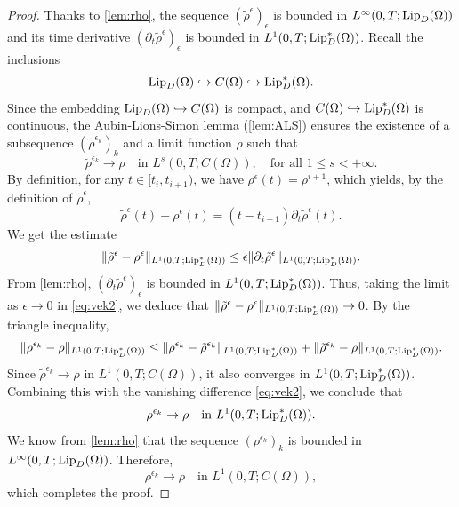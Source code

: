 \documentclass[final,reqno]{amsart}
\theoremstyle{plain}
\theoremstyle{definition}
\theoremstyle{remark}
\numberwithin{remark}{section}	%
\numberwithin{example}{section}	%
\newcommand{\Om}{\Omega}
\newcommand{\Lip}{\textup{Lip}}
\begin{document}
\begin{proof}
    Thanks to \cref{lem:rho}, the sequence $(\tilde{\rho}^{\epsilon})_{\epsilon}$ is bounded in $L^{\infty}(0,T; \Lip_D(\Omega))$ and its time derivative $(\partial_t \tilde{\rho}^{\epsilon})_{\epsilon}$ is bounded in $L^1(0,T; \Lip_{D}^*(\Om))$. 
    Recall the inclusions
    \[
        \Lip_{D}(\Om) \hookrightarrow C(\Om) \hookrightarrow \Lip_{D}^*(\Om).
    \]
    Since the embedding $\Lip_{D}(\Om) \hookrightarrow C(\Om)$ is compact, and $C(\Om) \hookrightarrow \Lip_{D}^*(\Om)$ is continuous, the Aubin-Lions-Simon lemma (\cref{lem:ALS}) ensures the existence of a subsequence $(\tilde{\rho}^{\epsilon_k})_{k}$ and a limit function $\rho$ such that
    \begin{equation}\label{eq:vek}
        \tilde{\rho}^{\epsilon_k} \to \rho \quad \text{in } L^s(0,T; C(\Omega)), \quad \text{for all } 1 \le s < +\infty.
    \end{equation}
     By definition, for any $t \in [t_i, t_{i+1})$, we have $\rho^\epsilon(t) = \rho^{i+1}$, which yields, by the definition of $\tilde{\rho}^{\epsilon}$,
    \begin{equation}
        \tilde{\rho}^{\epsilon}(t) - \rho^\epsilon(t) = (t - t_{i+1}) \partial_t \tilde{\rho}^{\epsilon}(t).
    \end{equation}
    We get the estimate
    \begin{equation}\label{eq:vek2}
        \Vert\tilde{\rho}^{\epsilon} - \rho^{\epsilon}\Vert_{L^1(0,T; \Lip_{D}^*(\Om))} \leq \epsilon \Vert\partial_t \tilde{\rho}^{\epsilon}\Vert_{L^1(0,T; \Lip_{D}^*(\Om))}.
    \end{equation}
    From \cref{lem:rho}, $(\partial_t \tilde{\rho}^{\epsilon})_{\epsilon}$ is bounded in $L^1(0,T; \Lip_{D}^*(\Om))$. Thus, taking the limit as $\epsilon \to 0$ in \eqref{eq:vek2}, we deduce that $\Vert\tilde{\rho}^{\epsilon} - \rho^{\epsilon}\Vert_{L^1(0,T; \Lip_{D}^*(\Om))} \to 0$. By the triangle inequality,
    \begin{equation}\label{eq:rhoep}
        \Vert\rho^{\epsilon_k} - \rho\Vert_{L^1(0,T; \Lip^{*}_{D}(\Om))} \leq \Vert\rho^{\epsilon_k} - \tilde{\rho}^{\epsilon_k}\Vert_{L^1(0,T; \Lip^{*}_{D}(\Om))} + \Vert\tilde{\rho}^{\epsilon_k} - \rho\Vert_{L^1(0,T; \Lip^{*}_{D}(\Om))}.
    \end{equation}
    Since $\tilde{\rho}^{\epsilon_k} \to \rho$ in $L^1(0,T; C(\Omega))$, it also converges in $L^1(0,T; \Lip_D^*(\Omega))$. Combining this with the vanishing difference \eqref{eq:vek2}, we conclude that 	
    \begin{equation}\label{eq:convrho}
        \rho^{\epsilon_k} \to \rho \quad \text{in } L^1(0,T; \Lip_D^*(\Om)).
    \end{equation}
 We know from \cref{lem:rho} that the sequence $(\rho^{\epsilon_k})_{k}$ is bounded in $L^{\infty}(0,T; \Lip_D(\Omega))$. Therefore, 
    \begin{equation*}
        \rho^{\epsilon_k} \to \rho \quad \text{in } L^1(0,T; C(\Omega)),
    \end{equation*}
    which completes the proof.
\end{proof}
\end{document}
